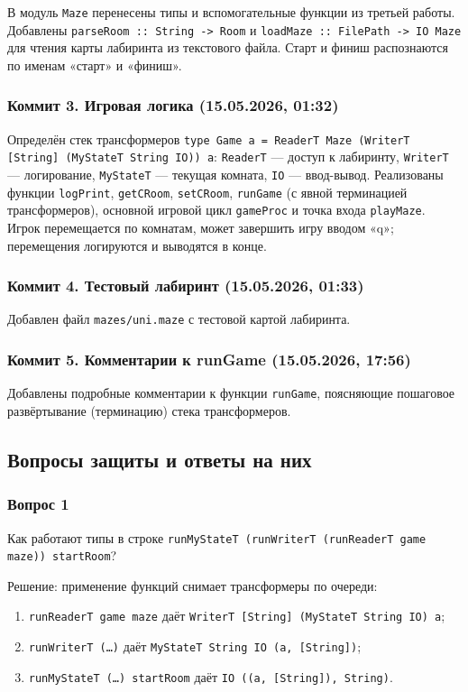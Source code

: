 \documentclass[a4paper, final]{article}
\begin{document}
В модуль \texttt{Maze} перенесены типы и вспомогательные функции из третьей
работы. Добавлены \texttt{parseRoom :: String -> Room} и
\texttt{loadMaze :: FilePath -> IO Maze} для чтения карты лабиринта из
текстового файла. Старт и финиш распознаются по именам «старт» и «финиш».

\subsubsection{Коммит 3. Игровая логика (15.05.2026, 01:32)}

Определён стек трансформеров
\texttt{type Game a = ReaderT Maze (WriterT [String] (MyStateT String IO)) a}:
\texttt{ReaderT} — доступ к лабиринту, \texttt{WriterT} — логирование,
\texttt{MyStateT} — текущая комната, \texttt{IO} — ввод-вывод. Реализованы
функции \texttt{logPrint}, \texttt{getCRoom}, \texttt{setCRoom},
\texttt{runGame} (с явной терминацией трансформеров), основной игровой цикл
\texttt{gameProc} и точка входа \texttt{playMaze}. Игрок перемещается по
комнатам, может завершить игру вводом «q»; перемещения логируются и выводятся
в конце.

\subsubsection{Коммит 4. Тестовый лабиринт (15.05.2026, 01:33)}

Добавлен файл \texttt{mazes/uni.maze} с тестовой картой лабиринта.

\subsubsection{Коммит 5. Комментарии к runGame (15.05.2026, 17:56)}

Добавлены подробные комментарии к функции \texttt{runGame}, поясняющие
пошаговое развёртывание (терминацию) стека трансформеров.

\subsection{Вопросы защиты и ответы на них}

\subsubsection{Вопрос 1}

Как работают типы в строке
\texttt{runMyStateT (runWriterT (runReaderT game maze)) startRoom}?

Решение: применение функций снимает трансформеры по очереди:
\begin{enumerate}[label=\arabic*),leftmargin=*]
  \item \texttt{runReaderT game maze} даёт
        \texttt{WriterT [String] (MyStateT String IO) a};
  \item \texttt{runWriterT (\ldots)} даёт
        \texttt{MyStateT String IO (a, [String])};
  \item \texttt{runMyStateT (\ldots) startRoom} даёт
        \texttt{IO ((a, [String]), String)}.
\end{enumerate}
\end{document}
